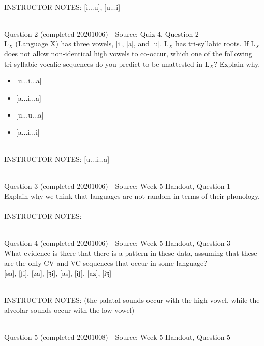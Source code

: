\documentclass[12pt]{article}
\begin{document}
~\\
INSTRUCTOR NOTES: [i...u], [u...i]


~\\

{\large Question 2} (completed 20201006) - Source: Quiz 4, Question 2\\

L$_X$ (Language X) has three vowels, [i], [a], and [u]. L$_X$ has tri-syllabic roots. If L$_X$ does not allow non-identical high vowels to co-occur, which one of the following tri-syllabic vocalic sequences do you predict to be unattested in L$_X$? Explain why.\\

\begin{itemize} \item {[u...i...a]} \item {[a...i...a]} \item {[u...u...a]} \item {[a...i...i]} \end{itemize}


~\\
INSTRUCTOR NOTES: [u...i...a]


~\\

{\large Question 3} (completed 20201006) - Source: Week 5 Handout, Question 1\\

Explain why we think that languages are not random in terms of their phonology.\\


~\\
INSTRUCTOR NOTES: 


~\\

{\large Question 4} (completed 20201006) - Source: Week 5 Handout, Question 3\\

What evidence is there that there is a pattern in these data, assuming that these are the only CV and VC sequences that occur in some language?\\

{[sa]}, {[ʃi]}, {[za]}, {[ʒi]}, {[as]}, {[iʃ]}, {[az]}, {[iʒ]}


~\\
INSTRUCTOR NOTES: (the palatal sounds occur with the high vowel, while the alveolar sounds occur with the low vowel)


~\\

{\large Question 5} (completed 20201008) - Source: Week 5 Handout, Question 5\\
\end{document}
